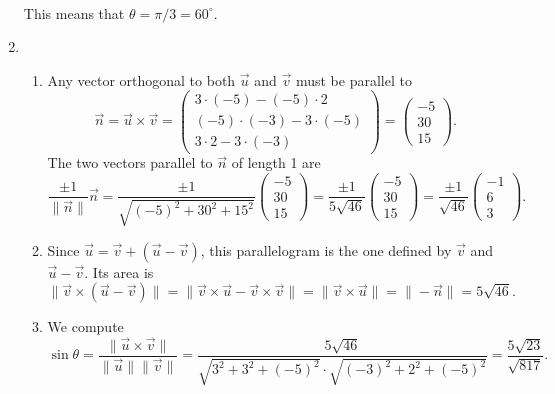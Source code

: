 \begin{enumerate}
\begin{align*}
\end{align*}
This means that $\theta = \pi/3 = 60^{\circ}$.
\newpage
\item \begin{enumerate}
\item Any vector orthogonal to both $\vec{u}$ and $\vec{v}$ must be parallel to
\begin{equation*}
\vec{n} = \vec{u}\times\vec{v} = \begin{pmatrix} 3\cdot (-5) - (-5)\cdot 2 \\ (-5)\cdot (-3) - 3\cdot (-5) \\ 3\cdot 2 - 3\cdot (-3) \end{pmatrix} = \begin{pmatrix} -5 \\ 30 \\ 15 \end{pmatrix}.
\end{equation*}
The two vectors parallel to $\vec{n}$ of length 1 are
\begin{equation*}
\frac{\pm 1}{\|\vec{n}\|}\vec{n} = \frac{\pm 1}{\sqrt{(-5)^2 + 30^2 + 15^2}}\begin{pmatrix} -5 \\ 30 \\ 15 \end{pmatrix} = \frac{\pm 1}{5\sqrt{46}}\begin{pmatrix} -5 \\ 30 \\ 15 \end{pmatrix} = \frac{\pm 1}{\sqrt{46}}\begin{pmatrix} -1 \\ 6 \\ 3 \end{pmatrix}.
\end{equation*}
\item Since $\vec{u} = \vec{v} + (\vec{u} - \vec{v})$, this parallelogram is the one defined by $\vec{v}$ and $\vec{u} - \vec{v}$. Its area is
\begin{equation*}
\|\vec{v}\times (\vec{u} - \vec{v})\| = \|\vec{v}\times\vec{u} - \vec{v}\times\vec{v}\| = \|\vec{v}\times\vec{u}\| = \|-\vec{n}\| = 5\sqrt{46}.
\end{equation*}
\item We compute
\begin{equation*}
\sin\theta = \frac{\|\vec{u}\times\vec{v}\|}{\|\vec{u}\|\|\vec{v}\|} = \frac{5\sqrt{46}}{\sqrt{3^2 + 3^2 + (-5)^2}\cdot\sqrt{(-3)^2 + 2^2 + (-5)^2}} = \frac{5\sqrt{23}}{\sqrt{817}}.

\end{equation*}
\end{enumerate}
\end{enumerate}
